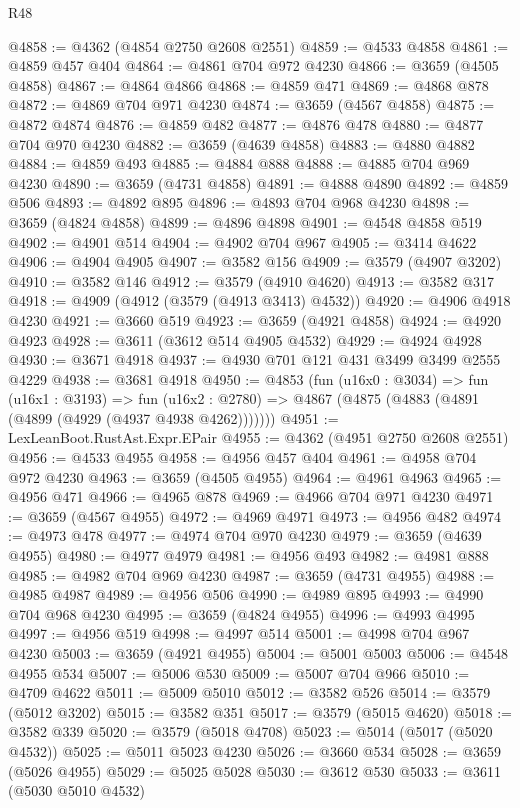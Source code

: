 \begin{lexlean}{R48}
\begin{coremodule}
@4858 := @4362 (@4854 @2750 @2608 @2551)
@4859 := @4533 @4858
@4861 := @4859 @457 @404
@4864 := @4861 @704 @972 @4230
@4866 := @3659 (@4505 @4858)
@4867 := @4864 @4866
@4868 := @4859 @471
@4869 := @4868 @878
@4872 := @4869 @704 @971 @4230
@4874 := @3659 (@4567 @4858)
@4875 := @4872 @4874
@4876 := @4859 @482
@4877 := @4876 @478
@4880 := @4877 @704 @970 @4230
@4882 := @3659 (@4639 @4858)
@4883 := @4880 @4882
@4884 := @4859 @493
@4885 := @4884 @888
@4888 := @4885 @704 @969 @4230
@4890 := @3659 (@4731 @4858)
@4891 := @4888 @4890
@4892 := @4859 @506
@4893 := @4892 @895
@4896 := @4893 @704 @968 @4230
@4898 := @3659 (@4824 @4858)
@4899 := @4896 @4898
@4901 := @4548 @4858 @519
@4902 := @4901 @514
@4904 := @4902 @704 @967
@4905 := @3414 @4622
@4906 := @4904 @4905
@4907 := @3582 @156
@4909 := @3579 (@4907 @3202)
@4910 := @3582 @146
@4912 := @3579 (@4910 @4620)
@4913 := @3582 @317
@4918 := @4909 (@4912 (@3579 (@4913 @3413) @4532))
@4920 := @4906 @4918 @4230
@4921 := @3660 @519
@4923 := @3659 (@4921 @4858)
@4924 := @4920 @4923
@4928 := @3611 (@3612 @514 @4905 @4532)
@4929 := @4924 @4928
@4930 := @3671 @4918
@4937 := @4930 @701 @121 @431 @3499 @3499 @2555 @4229
@4938 := @3681 @4918
@4950 := @4853
    (fun (u16x0 : @3034) =>
    fun (u16x1 : @3193) =>
    fun (u16x2 : @2780) => @4867 (@4875 (@4883 (@4891 (@4899 (@4929 (@4937 @4938 @4262)))))))
@4951 := LexLeanBoot.RustAst.Expr.EPair
@4955 := @4362 (@4951 @2750 @2608 @2551)
@4956 := @4533 @4955
@4958 := @4956 @457 @404
@4961 := @4958 @704 @972 @4230
@4963 := @3659 (@4505 @4955)
@4964 := @4961 @4963
@4965 := @4956 @471
@4966 := @4965 @878
@4969 := @4966 @704 @971 @4230
@4971 := @3659 (@4567 @4955)
@4972 := @4969 @4971
@4973 := @4956 @482
@4974 := @4973 @478
@4977 := @4974 @704 @970 @4230
@4979 := @3659 (@4639 @4955)
@4980 := @4977 @4979
@4981 := @4956 @493
@4982 := @4981 @888
@4985 := @4982 @704 @969 @4230
@4987 := @3659 (@4731 @4955)
@4988 := @4985 @4987
@4989 := @4956 @506
@4990 := @4989 @895
@4993 := @4990 @704 @968 @4230
@4995 := @3659 (@4824 @4955)
@4996 := @4993 @4995
@4997 := @4956 @519
@4998 := @4997 @514
@5001 := @4998 @704 @967 @4230
@5003 := @3659 (@4921 @4955)
@5004 := @5001 @5003
@5006 := @4548 @4955 @534
@5007 := @5006 @530
@5009 := @5007 @704 @966
@5010 := @4709 @4622
@5011 := @5009 @5010
@5012 := @3582 @526
@5014 := @3579 (@5012 @3202)
@5015 := @3582 @351
@5017 := @3579 (@5015 @4620)
@5018 := @3582 @339
@5020 := @3579 (@5018 @4708)
@5023 := @5014 (@5017 (@5020 @4532))
@5025 := @5011 @5023 @4230
@5026 := @3660 @534
@5028 := @3659 (@5026 @4955)
@5029 := @5025 @5028
@5030 := @3612 @530
@5033 := @3611 (@5030 @5010 @4532)

\end{coremodule}
\end{lexlean}

